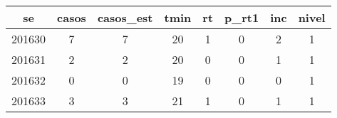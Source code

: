 \begin{tabular}{c|ccccccc}
  \hline
se & casos & casos\_est & tmin & rt & p\_rt1 & inc & nivel \\ 
  \hline
201630 & 7 & 7 & 20 & 1 & 0 & 2 & 1 \\ 
  201631 & 2 & 2 & 20 & 0 & 0 & 1 & 1 \\ 
  201632 & 0 & 0 & 19 & 0 & 0 & 0 & 1 \\ 
  201633 & 3 & 3 & 21 & 1 & 0 & 1 & 1 \\ 
   \hline
\end{tabular}
